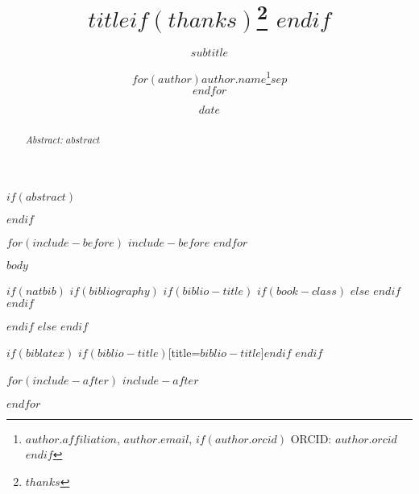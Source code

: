 \documentclass[11pt, a4paper, oneside]{article}
\title{$title$$if(thanks)$\thanks{$thanks$} $endif$ }
\subtitle{$subtitle$}
\author{$for(author)$$author.name$\thanks{$author.affiliation$, \texttt{$author.email$}, $if(author.orcid)$ ORCID: \href{https://orcid.org/$author.orcid$}{$author.orcid$}$endif$}$sep$\par $endfor$}
\institute{$for(author)$$author.affiliation$$sep$ \and $endfor$}
\date{$date$}
\begin{document}
\maketitle

\thispagestyle{empty}


\normalsize
\pagestyle{fancy}

$if(abstract)$
\begin{abstract}
\vspace{-1cm}\noindent \emph{Abstract:} $abstract$
\end{abstract}
$endif$

$for(include-before)$
$include-before$
$endfor$

$body$

$if(natbib)$
  $if(bibliography)$
    $if(biblio-title)$
      $if(book-class)$
        \renewcommand\bibname{$biblio-title$}
      $else$
        \renewcommand\refname{$biblio-title$}
      $endif$
    $endif$
    
  $endif$
$else$
$endif$

$if(biblatex)$
\printbibliography$if(biblio-title)$[title=$biblio-title$]$endif$
$endif$

$for(include-after)$
$include-after$

$endfor$
\end{document}
